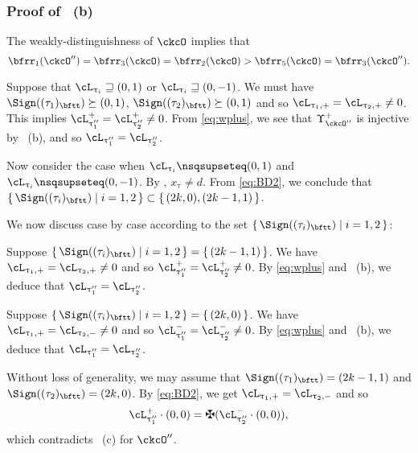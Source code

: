 \documentclass[12pt,a4paper]{amsart}
\numberwithin{equation}{section}
\theoremstyle{remark}
\def\uptaupp{\uptau^{\prime\prime}}
\begin{document}
\subsubsection*{Proof of ~(b)}
\def\tauot{(\tau_1)_{\bftt}}
\def\tautt{(\tau_2)_{\bftt}}
The weakly-distinguishness of $\ckcO$ implies that
\begin{equation}\label{eq:wplus}
  \bfrr_{1}(\ckcO'') = \bfrr_{3}(\ckcO)=\bfrr_{2}(\ckcO)>\bfrr_{5}(\ckcO) = \bfrr_{3}(\ckcO'').
\end{equation}

Suppose that  $\ac_{\uptau_{i}} \sqsupseteq (0,1)$ or $\ac_{\uptau_{i}} \sqsupseteq (0,-1)$.
We must have $\Sign(\tauot)\succeq (0,1)$, $\Sign(\tautt)\succeq (0,1)$ and so
$\ppac{\uptau_1} = \ppac{\uptau_2}\neq 0$.
This implies $\pac{\uptaupp_{1}}=\pac{\uptaupp_{2}}\neq 0$. From \eqref{eq:wplus},
we see that $\Upsilon^+_{\ckcO''}$ is injective by ~(b), and so $\ac_{\uptaupp_{1}}
= \ac_{\uptaupp_{2}}$.

\smallskip

Now consider the case when $\ac_{\uptau_{i}}\nsqsupseteq (0,1)$ and
$\ac_{\uptau_{i}}\nsqsupseteq (0,-1)$. By , $x_{\uptau}\neq d$.
From \eqref{eq:BD2}, we conclude that $\set{\Sign((\tau_{i})_{\bftt})|i=1,2}
\subset\set{ (2k,0),(2k-1,1)}$.

We now discuss case by case according to the set $\set{\Sign((\tau_{i})_{\bftt})|i=1,2}$:
  \begin{enumPF}
    \item Suppose
    $\set{\Sign(({\tau_{i}})_{\bftt})|i=1,2} = \set{(2k-1,1)}$. We have
    $\ppac{\uptau_1} = \ppac{\uptau_2}\neq 0$ and so
    $\pac{\uptaupp_{1}}=\pac{\uptaupp_{2}}\neq 0$.
    By \eqref{eq:wplus} and ~(b), we deduce
    that $\ac_{\uptaupp_{1}}=\ac_{\uptaupp_{2}}$.
    \item
    Suppose $\set{\Sign(({\tau_{i}})_{\bftt})|i=1,2} = \set{(2k,0)}$. We have
   $\ppac{\uptau_1}=\nnac{\uptau_2}\neq 0$ and so
   $\nac{\uptaupp_{1}}=\nac{\uptaupp_{2}}\neq 0$. By \eqref{eq:wplus} and
   ~(b), we deduce that $\ac_{\uptaupp_{1}}=\ac_{\uptaupp_{2}}$.
    \item
    Without loss of generality, we may assume that $\Sign(({\tau_{1}})_{\bftt}) =
    (2k-1,1)$ and $\Sign(({\tau_{2}})_{\bftt}) = (2k,0)$. By \eqref{eq:BD2}, we
    get $\ppac{\uptau_1} = \nnac{\uptau_2}$ and so
    \[
      \pac{\uptaupp_{1}}\cdot (0,0)=\maltese(\nac{\uptaupp_{2}}\cdot (0,0)),
    \]
    which contradicts ~(c) for $\ckcO''$.
  \end{enumPF}
\end{document}
